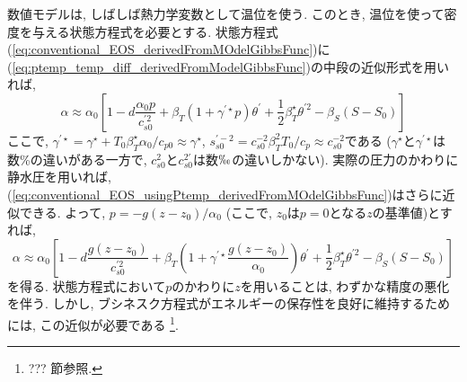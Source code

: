 数値モデルは, しばしば熱力学変数として温位を使う. 
このとき, 温位を使って密度を与える状態方程式を必要とする. 
状態方程式(\ref{eq:conventional_EOS_derivedFromMOdelGibbsFunc})に
(\ref{eq:ptemp_temp_diff_derivedFromModelGibbsFunc})の中段の近似形式を用いれば, 
\begin{equation}
 \alpha \approx \alpha_0 \left[
   1 - d\dfrac{\alpha_0 p}{c_{s0}^{\prime 2}} + \beta_T(1 + \gamma^{\prime \star} p)\theta^\prime
   + \dfrac{1}{2} \beta_T^\star \theta^{\prime 2} - \beta_S(S-S_0)
  \right]
\label{eq:conventional_EOS_usingPtemp_derivedFromMOdelGibbsFunc}
\end{equation}
ここで, 
$\gamma^{\prime \star} = \gamma^\star + T_0 \beta_T^\star \alpha_0 /c_{p0} \approx \gamma^\star$, 
$s_{s0}^{\prime -2} = c_{s0}^{-2} \beta_T^2 T_0/c_p \approx c_{s0}^{-2}$である 
($\gamma^\star$と$\gamma^{\prime \star}$は数\%の違いがある一方で,  
$c_{s0}^2$と$c_{s0}^{2 \prime}$は数$\permil$の違いしかない).
実際の圧力のかわりに静水圧を用いれば, (\ref{eq:conventional_EOS_usingPtemp_derivedFromMOdelGibbsFunc})はさらに近似できる.
よって, $p=-g(z-z_0)/\alpha_0$ (ここで, $z_0$は$p=0$となる$z$の基準値)とすれば, 
\begin{equation}
 \alpha \approx \alpha_0 \left[
   1 - d\dfrac{g(z - z_0)}{c_{s0}^{\prime 2}} + \beta_T(1 + \gamma^{\prime \star} \dfrac{g(z-z_0)}{\alpha_0})\theta^\prime
   + \dfrac{1}{2} \beta_T^\star \theta^{\prime 2} - \beta_S(S-S_0)
  \right]
\label{eq:conventional_EOS_usingPtempHydroStatic_derivedFromMOdelGibbsFunc}
\end{equation}
を得る. 
状態方程式において$p$のかわりに$z$を用いることは, わずかな精度の悪化を伴う. 
しかし, ブシネスク方程式がエネルギーの保存性を良好に維持するためには, この近似が必要である%
\footnote{
??? 節参照. 
}. 